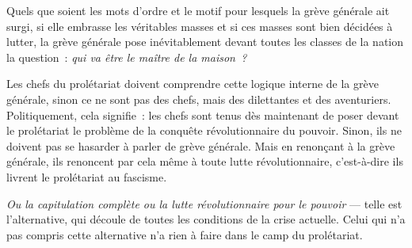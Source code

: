 \documentclass[french,twoside]{book} %
\begin{document}
Quels que soient les mots d’ordre et le motif pour lesquels la grève générale ait surgi, si elle embrasse les véritables masses et si ces masses sont bien décidées à lutter, la grève générale pose inévitablement devant toutes les classes de la nation la question : \emph{qui va être le maître de la maison ?}\par
Les chefs du prolétariat doivent comprendre cette logique interne de la grève générale, sinon ce ne sont pas des chefs, mais des dilettantes et des aventuriers. Politiquement, cela signifie : les chefs sont tenus dès maintenant de poser devant le prolétariat le problème de la conquête révolutionnaire du pouvoir. Sinon, ils ne doivent  pas se hasarder à parler de grève générale. Mais en renonçant à la grève générale, ils renoncent par cela même à toute lutte révolutionnaire, c’est-à-dire ils livrent le prolétariat au fascisme.\par
\emph{Ou la capitulation complète ou la lutte révolutionnaire pour le pouvoir} — telle est l’alternative, qui découle de toutes les conditions de la crise actuelle. Celui qui n’a pas compris cette alternative n’a rien à faire dans le camp du prolétariat.
\end{document}
